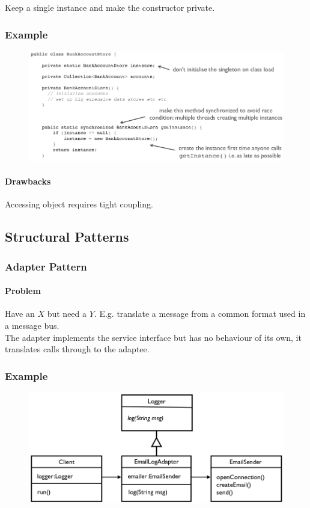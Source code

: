 \documentclass[twocolumn,english]{article}
\begin{document}
Keep a single instance and make the constructor private.


\subsubsection*{Example}

\begin{figure}[H]
\centering{}\includegraphics[width=0.75\columnwidth]{img/singleton} 
\end{figure}



\paragraph{Drawbacks}

Accessing object requires tight coupling.


\subsection{Structural Patterns}


\subsubsection{Adapter Pattern}


\paragraph{Problem}

Have an $X$ but need a $Y$. E.g. translate a message from a common
format used in a message bus. \\
The adapter
implements the service interface but has no behaviour of
its own, it translates calls through to the adaptee.


\subsubsection*{Example}

\begin{figure}[H]
\centering{}\includegraphics[width=0.6\columnwidth]{img/adapter} 
\end{figure}
\end{document}
